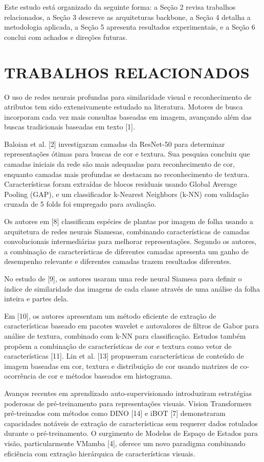 \documentclass[conference]{IEEEtran}
\begin{document}
Este estudo está organizado da seguinte forma: a Seção 2 revisa trabalhos relacionados, a Seção 3 descreve as arquiteturas backbone, a Seção 4 detalha a metodologia aplicada, a Seção 5 apresenta resultados experimentais, e a Seção 6 conclui com achados e direções futuras.


\section{TRABALHOS RELACIONADOS}

O uso de redes neurais profundas para similaridade visual e reconhecimento de atributos tem sido extensivamente estudado na literatura. Motores de busca incorporam cada vez mais consultas baseadas em imagem, avançando além das buscas tradicionais baseadas em texto [1].

Baloian et al. [2] investigaram camadas da ResNet-50 para determinar representações ótimas para buscas de cor e textura. Sua pesquisa concluiu que camadas iniciais da rede são mais adequadas para reconhecimento de cor, enquanto camadas mais profundas se destacam no reconhecimento de textura. Características foram extraídas de blocos residuais usando Global Average Pooling (GAP), e um classificador k-Nearest Neighbors (k-NN) com validação cruzada de 5 folds foi empregado para avaliação.

Os autores em [8] classificam espécies de plantas por imagem de folha usando a arquitetura de redes neurais Siamesas, combinando características de camadas convolucionais intermediárias para melhorar representações. Segundo os autores, a combinação de características de diferentes camadas apresenta um ganho de desempenho relevante e diferentes camadas trazem resultados diferentes.

No estudo de [9], os autores usaram uma rede neural Siamesa para definir o índice de similaridade das imagens de cada classe através de uma análise da folha inteira e partes dela.

Em [10], os autores apresentam um método eficiente de extração de características baseado em pacotes wavelet e autovalores de filtros de Gabor para análise de textura, combinado com k-NN para classificação. Estudos também propõem a combinação de características de cor e textura como vetor de características [11]. Lin et al. [13] propuseram características de conteúdo de imagem baseadas em cor, textura e distribuição de cor usando matrizes de co-ocorrência de cor e métodos baseados em histograma.

Avanços recentes em aprendizado auto-supervisionado introduziram estratégias poderosas de pré-treinamento para representações visuais. Vision Transformers pré-treinados com métodos como DINO [14] e iBOT [7] demonstraram capacidades notáveis de extração de características sem requerer dados rotulados durante o pré-treinamento. O surgimento de Modelos de Espaço de Estados para visão, particularmente VMamba [4], oferece um novo paradigma combinando eficiência com extração hierárquica de características visuais.
\end{document}
